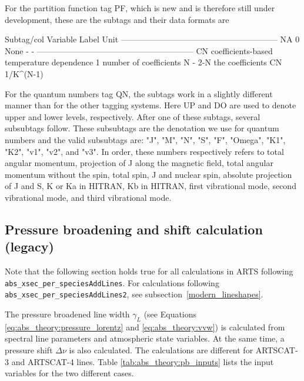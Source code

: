 For the partition function tag PF, which is new and is therefore still under development, these are the subtags and their data formats are
\begin{code}
Subtag/col  Variable                        Label    Unit
---------------------------------------------------------
       NA
        0  None                                 -       -
---------------------------------------------------------
       CN  coefficients-based temperature dependence
        1  number of coefficients            N          -
      2-N  the coefficients                 CN  1/K^(N-1)

\end{code}

For the quantum numbers tag QN, the subtags work in a slightly different manner than for the other tagging systems.  Here UP and DO are
used to denote upper and lower levels, respectively.  After one of these subtags, several subsubtags follow.  These subsubtags are the denotation
we use for quantum numbers and the valid subsubtags are: "J", "M", "N", "S", "F", "Omega", "K1", "K2", "v1", "v2", and "v3". In order, these
numbers respectively refers to total angular momentum, projection of J along the magnetic field, 
total angular momentum without the spin, total spin, J and nuclear spin, absolute projection of J and S,
K or Ka in HITRAN, Kb in HITRAN, first vibrational mode, second vibrational mode, and third vibrational mode.  

\subsection{Pressure broadening and shift calculation (legacy) \label{legacy_lineshapes}}
Note that the following section holds true for all
calculations in ARTS following \verb|abs_xsec_per_speciesAddLines|.
For calculations following \verb|abs_xsec_per_speciesAddLines2|,
see subsection~\ref{modern_lineshapes}.

The pressure broadened line width $\gamma_L$ (see Equations
\ref{eq:abs_theory:pressure_lorentz} and \ref{eq:abs_theory:vvw}) is
calculated from spectral line parameters and atmospheric state
variables. At the same time, a pressure shift $\Delta \nu$ is also calculated.
The calculations are different for ARTSCAT-3 and ARTSCAT-4
lines. Table \ref{tab:abs_theory:pb_inputs} lists the input variables
for the two different cases. 

